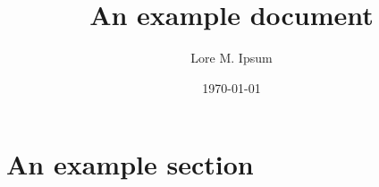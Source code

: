 \documentclass{rntz}
\title{An example document}
\author{Lore M. Ipsum}
\date{\today}
\begin{document}
\maketitle

\begin{abstract}
  \lipsum[1]
\end{abstract}

\section{An example section}
\lipsum
\end{document}
